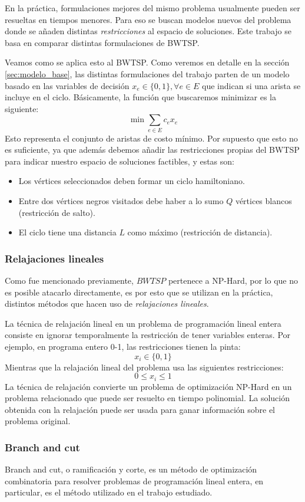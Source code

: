 \documentclass[10pt, a4paper]{article}
\theoremstyle{definition}
\begin{document}
En la práctica, formulaciones mejores del mismo problema usualmente pueden ser resueltas en tiempos menores. Para eso se buscan modelos nuevos del problema donde se añaden distintas \textit{restricciones} al espacio de soluciones. Este trabajo se basa en comparar distintas formulaciones de BWTSP.

Veamos como se aplica esto al BWTSP. Como veremos en detalle en la sección \ref{sec:modelo_base}, las distintas formulaciones del trabajo parten de un modelo basado en las variables de decisión $x_e \in \{0,1\}, \forall e \in E$ que indican si una arista se incluye en el ciclo. Básicamente, la función que buscaremos minimizar es la siguiente:
$$\min \sum_{e \in E} c_{e} x_{e}$$
Esto representa el conjunto de aristas de costo mínimo. Por supuesto que esto no es suficiente, ya que además debemos añadir las restricciones propias del BWTSP para indicar nuestro espacio de soluciones factibles, y estas son:
\begin{itemize}
  \item Los vértices seleccionados deben formar un ciclo hamiltoniano.
  \item Entre dos vértices negros visitados debe haber a lo sumo $Q$ vértices blancos (restricción de salto).
  \item El ciclo tiene una distancia $L$ como máximo (restricción de distancia).
\end{itemize} 

\subsubsection{Relajaciones lineales}
Como fue mencionado previamente, $BWTSP$ pertenece a NP-Hard, por lo que no es posible atacarlo directamente, es por esto que se utilizan en la práctica, distintos métodos que hacen uso de \textit{relajaciones lineales}.

La técnica de relajación lineal en un problema de programación lineal entera consiste en ignorar temporalmente la restricción de tener variables enteras. Por ejemplo, en programa entero 0-1, las restricciones tienen la pinta:
$$x_i \in \{0,1\}$$
Mientras que la relajación lineal del problema usa las siguientes restricciones:
$$0 \leq x_i \leq 1$$
La técnica de relajación convierte un problema de optimización NP-Hard en un problema relacionado que puede ser resuelto en tiempo polinomial. La solución obtenida con la relajación puede ser usada para ganar información sobre el problema original. 


\subsubsection{Branch and cut}
Branch and cut, o ramificación y corte, es un método de optimización combinatoria para resolver problemas de programación lineal entera, en particular, es el método utilizado en el trabajo estudiado.
\end{document}
